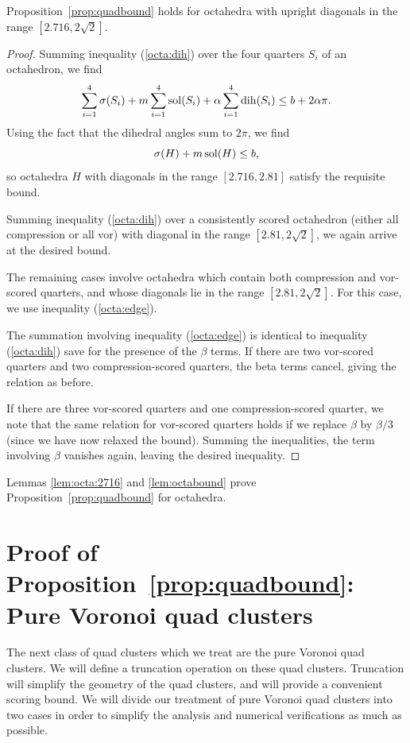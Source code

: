 \begin{lem}
\label{lem:octabound}
Proposition~\ref{prop:quadbound} holds for octahedra with upright diagonals
in the range $[2.716, 2\sqrt{2}]$.
\end{lem}
\begin{proof}
Summing inequality (\ref{octa:dih}) over the four quarters $S_i$ of an octahedron, we find
\[
\sum_{i=1}^4 \operatorname{\sigma}(S_i) + m \sum_{i=1}^4 \operatorname{sol}(S_i) + \alpha \sum_{i=1}^4 \operatorname{dih}(S_i)
\le b + 2 \alpha \pi.
\]
Using the fact that the dihedral angles sum to $2 \pi$, we find
\[
\operatorname{\sigma}(H)  + m \operatorname{sol}(H) \le b,
\]
so octahedra $H$ with diagonals in the range $[2.716,2.81]$
satisfy the requisite bound.

Summing inequality (\ref{octa:dih}) over a consistently scored octahedron
(either all compression or all vor) with diagonal in the
range $[2.81, 2\sqrt{2}]$, we again arrive at the desired bound.

The remaining cases involve octahedra which contain both compression
and vor-scored quarters, and whose diagonals lie in the range
$[2.81, 2\sqrt{2}]$.  For this case, we use inequality (\ref{octa:edge}).

The summation involving inequality (\ref{octa:edge}) is identical to
inequality (\ref{octa:dih}) save for
the presence of the $\beta$ terms.  If there are two vor-scored
quarters and two compression-scored quarters, the beta terms cancel,
giving the relation as before.

If there are three vor-scored quarters and one compression-scored
quarter, we note that the same relation for vor-scored quarters
holds if we replace $\beta$ by $\beta/3$ (since we have now relaxed
the bound).  Summing the inequalities, the term involving $\beta$
vanishes again, leaving the desired inequality.
\end{proof}

Lemmas \ref{lem:octa:2716} and \ref{lem:octabound} prove
Proposition~\ref{prop:quadbound} for octahedra.

\section{Proof of Proposition~\ref{prop:quadbound}: Pure Voronoi quad clusters}

The next class of quad clusters which we treat are the pure
Voronoi quad clusters.  We will define a truncation operation
on these quad clusters.  Truncation will simplify the geometry of
the quad clusters, and will provide a convenient scoring bound.
We will divide our treatment of pure Voronoi quad clusters
into two cases in order to simplify the analysis and numerical
verifications as much as possible.

